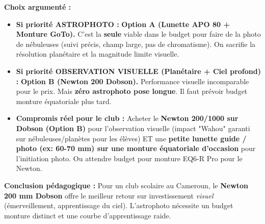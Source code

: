 \documentclass[11pt]{article}
\begin{document}
\begin{exoresolu}
\textbf{Choix argumenté :}
\begin{itemize}
    \item \textbf{Si priorité ASTROPHOTO :} \textbf{Option A (Lunette APO 80 + Monture GoTo).} C'est la \textbf{seule} viable dans le budget pour faire de la photo de nébuleuses (suivi précis, champ large, pas de chromatisme). On sacrifie la résolution planétaire et la magnitude limite visuelle.
    \item \textbf{Si priorité OBSERVATION VISUELLE (Planétaire + Ciel profond) :} \textbf{Option B (Newton 200 Dobson).} Performance visuelle incomparable pour le prix. Mais \textbf{zéro astrophoto pose longue}. Il faut prévoir budget monture équatoriale plus tard.
    \item \textbf{Compromis réel pour le club :} Acheter le \textbf{Newton 200/1000 sur Dobson (Option B)} pour l'observation visuelle (impact "Wahou" garanti sur nébuleuses/planètes pour les élèves) ET une \textbf{petite lunette guide / photo (ex: 60-70 mm) sur une monture équatoriale d'occasion} pour l'initiation photo. Ou attendre budget pour monture EQ6-R Pro pour le Newton.
\end{itemize}
\textbf{Conclusion pédagogique :} Pour un club scolaire au Cameroun, le \textbf{Newton 200 mm Dobson} offre le meilleur retour sur investissement \emph{visuel} (émerveillement, apprentissage du ciel). L'astrophoto nécessite un budget monture distinct et une courbe d'apprentissage raide.
\end{exoresolu}
\end{document}

